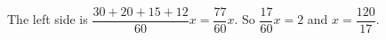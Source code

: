 The left side is $\dfrac{30+20+15+12}{60}x=\dfrac{77}{60}x$. So $\dfrac{17}{60}x=2$ and $x=\boxed{\dfrac{120}{17}}$.
